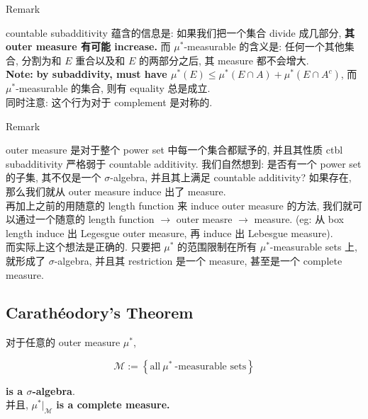 \documentclass{qlnotes-export}
\begin{document}
\begin{qlremark}{Remark}

countable subadditivity 蕴含的信息是: 如果我们把一个集合 divide 成几部分, \textbf{其 outer measure 有可能 increase.} 而 \(\mu^{\ast}\)-measurable 的含义是: 任何一个其他集合, 分割为和 \(E\) 重合以及和 \(E\) 的两部分之后, 其 measure 都不会增大.\\
\textbf{Note:} \textbf{by subaddivity, must have \(\mu^{\ast}(E) \leq \mu^{\ast}(E \cap A) + \mu^{\ast}(E \cap A^{c})\)}, 而 \(\mu^{\ast}\)-measurable 的集合, 则有 equality 总是成立.\\
同时注意: 这个行为对于 complement 是对称的.

\end{qlremark}

\begin{qlremark}{Remark}

outer measure 是对于整个 power set 中每一个集合都赋予的, 并且其性质 ctbl subadditivity 严格弱于 countable additivity. 我们自然想到: 是否有一个 power set 的子集, 其不仅是一个 \(\sigma\)-algebra, 并且其上满足 countable additivity? 如果存在, 那么我们就从 outer measure induce 出了 measure.\\
再加上之前的用随意的 length function 来 induce outer measure 的方法, 我们就可以通过一个随意的 length function \(\rightarrow\) outer measre \(\rightarrow\) measure. (eg: 从 box length induce 出 Legesgue outer measure, 再 induce 出 Lebesgue measure).\\
而实际上这个想法是正确的. 只要把 \(\mu^{\ast}\) 的范围限制在所有 \(\mu^{\ast}\)-measurable sets 上, 就形成了 \(\sigma\)-algebra, 并且其 restriction 是一个 measure, 甚至是一个 complete measure.

\end{qlremark}

\subsection{Carathéodory's Theorem}\label{carathuxe9odorys-theorem}

\begin{theorem}\label{thm-02-outer-measure-completion-of-a-measurable-space-theorem-003}

对于任意的 outer measure \(\mu^{\ast}\),

\[\mathcal{M} := \left\{ {\text{all}\ \mu^{\ast}\ \text{-measurable sets}} \right\}\]

\textbf{is a \(\sigma\)-algebra}.\\
并且, \(\mu^{\ast}|_{\mathcal{M}}\) \textbf{is a complete measure.}

\end{theorem}
\end{document}
